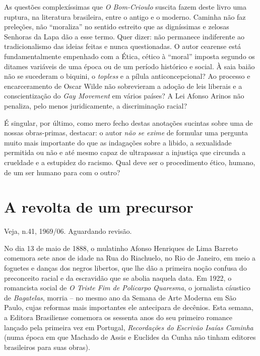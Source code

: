 \documentclass[
  letterpaper,
  DIV=11,
  numbers=noendperiod]{scrreprt}
\begin{document}
As questões complexíssimas que \emph{O Bom-Crioulo} suscita fazem deste
livro uma ruptura, na literatura brasileira, entre o antigo e o moderno.
Caminha não faz preleções, não ``moraliza'' no sentido estreito que as
digníssimas e zelosas Senhoras da Lapa dão a esse termo. Quer dizer: não
permanece indiferente ao tradicionalismo das ideias feitas e nunca
questionadas. O autor cearense está fundamentalmente empenhado com a
Ética, cético à ``moral'' imposta segundo os ditames variáveis de uma
época ou de um período histórico e social. À saia baião não se sucederam
o biquini, o \emph{topless} e a pílula anticoncepcional? Ao processo e
encarceramento de Oscar Wilde não sobrevieram a adoção de leis liberais
e a conscientização do \emph{Gay Movement} em vários países? A Lei
Afonso Arinos não penaliza, pelo menos juridicamente, a discriminação
racial?

É singular, por último, como mero fecho destas anotações sucintas sobre
uma de nossas obras-primas, destacar: o autor \emph{não se exime} de
formular uma pergunta muito mais importante do que as indagações sobre a
libido, a sexualidade permitida ou não e até mesmo capaz de ultrapassar
a injustiça que circunda a crueldade e a estupidez do racismo. Qual deve
ser o procedimento ético, humano, de um ser humano para com o outro?

\chapter{A revolta de um precursor}\label{a-revolta-de-um-precursor}

Veja, n.41, 1969/06. Aguardando revisão.

\hfill\break

No dia 13 de maio de 1888, o mulatinho Afonso Henriques de Lima Barreto
comemora sete anos de idade na Rua do Riachuelo, no Rio de Janeiro, em
meio a foguetes e danças dos negros libertos, que lhe dão a primeira
noção confusa do preconceito racial e da escravidão que se abolia
naquela data. Em 1922, o romancista social de \emph{O Triste Fim de
Policarpo Quaresma}, o jornalista cáustico de \emph{Bagatelas}, morria
-- no mesmo ano da Semana de Arte Moderna em São Paulo, cujas reformas
mais importantes ele antecipara de decênios. Esta semana, a Editora
Brasiliense comemora os sessenta anos do seu primeiro romance lançado
pela primeira vez em Portugal, \emph{Recordações do Escrivão Isaías
Caminha} (numa época em que Machado de Assis e Euclides da Cunha não
tinham editores brasileiros para suas obras).
\end{document}
